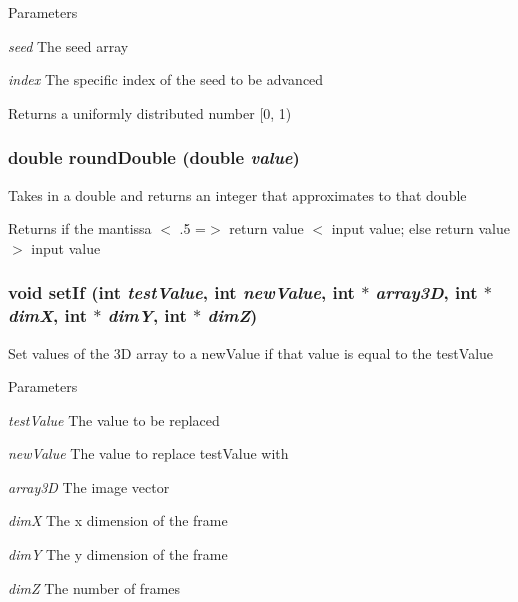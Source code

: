 \begin{DoxyParams}{Parameters}
\item[{\em seed}]The seed array \item[{\em index}]The specific index of the seed to be advanced \end{DoxyParams}
\begin{DoxyReturn}{Returns}
a uniformly distributed number \mbox{[}0, 1) 
\end{DoxyReturn}
\hypertarget{ex__particle__CUDA__naive_8cu_a8b9e6dd1f65d08f3f2537574b12f7fe5}{
\subsubsection[{roundDouble}]{\setlength{\rightskip}{0pt plus 5cm}double roundDouble (double {\em value})}}
\label{ex__particle__CUDA__naive_8cu_a8b9e6dd1f65d08f3f2537574b12f7fe5}
Takes in a double and returns an integer that approximates to that double \begin{DoxyReturn}{Returns}
if the mantissa $<$ .5 =$>$ return value $<$ input value; else return value $>$ input value 
\end{DoxyReturn}
\hypertarget{ex__particle__CUDA__naive_8cu_a0ee0664eb7123e026513e7cf19ba3434}{
\subsubsection[{setIf}]{\setlength{\rightskip}{0pt plus 5cm}void setIf (int {\em testValue}, \/  int {\em newValue}, \/  int $\ast$ {\em array3D}, \/  int $\ast$ {\em dimX}, \/  int $\ast$ {\em dimY}, \/  int $\ast$ {\em dimZ})}}
\label{ex__particle__CUDA__naive_8cu_a0ee0664eb7123e026513e7cf19ba3434}
Set values of the 3D array to a newValue if that value is equal to the testValue 
\begin{DoxyParams}{Parameters}
\item[{\em testValue}]The value to be replaced \item[{\em newValue}]The value to replace testValue with \item[{\em array3D}]The image vector \item[{\em dimX}]The x dimension of the frame \item[{\em dimY}]The y dimension of the frame \item[{\em dimZ}]The number of frames \end{DoxyParams}
